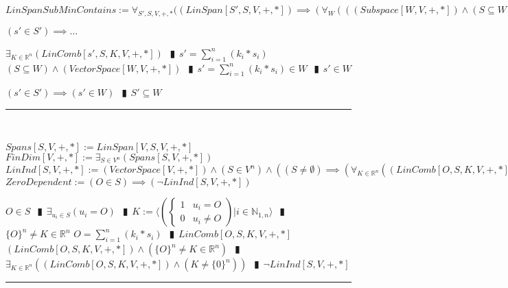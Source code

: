 \documentclass{book}
\newcommand{\abr}{:=}
\newcommand{\pipe}{$\phantom{(}\vrectangleblack\phantom{)}$}
\begin{document}
\begin{shaded}
  $LinSpanSubMinContains \abr \forall_{S', S, V, +, *}((LinSpan[S', S, V, +, *]) \implies (\forall_{W}(((Subspace[W, V, + ,*]) \land (S \subseteq W)) \implies (S' \subseteq W)))$
  \begin{enumerate}
    \lit $(s' \in S') \implies \ldots$
    \begin{enumerate}
      \lit $\exists_{K \in \mathbb{R}^n}(LinComb[s', S, K, V, +, *])$ \pipe $s' = \sum_{i = 1}^{n}(k_i * s_i)$
      \lit $(S \subseteq W) \land (VectorSpace[W, V, + ,*])$ \pipe $s' = \sum_{i = 1}^{n}(k_i * s_i) \in W$ \pipe $s' \in W$
    \end{enumerate}
    \lit $(s' \in S') \implies (s' \in W)$ \pipe $S' \subseteq W$
  \end{enumerate} \vspace{.75mm} \hrule \vspace{.75mm} \ \\ 
\end{shaded} %

$Spans[S, V, +, *] \abr LinSpan[V, S, V, +, *]$ \\
$FinDim[V, +, *] \abr \exists_{S \in V^n}(Spans[S, V, +, *])$ \\

$LinInd[S, V, +, *] \abr (VectorSpace[V, +, *]) \land (S \in V^n) \land ((S \neq \emptyset) \implies (\forall_{K \in \mathbb{R}^n}((LinComb[O, S, K, V, +, *]) \implies (K = \{0\}^n))))$ \\

$ZeroDependent \abr (O \in S) \implies (\lnot LinInd[S, V, +, *])$
\begin{enumerate}
  \lit $O \in S$ \pipe $\exists_{u_i \in S}(u_i = O)$ \pipe $K \abr \langle \left(\begin{cases} 
      1 & u_i = O \\
      0 & u_i \neq O 
    \end{cases}\right) | i \in \mathbb{N}_{1, n} \rangle$ \pipe $\{O\}^n \neq K \in \mathbb{R}^n$
  \lit $O = \sum_{i = 1}^{n}(k_i * s_i)$ \pipe $LinComb[O, S, K, V, +, *]$
  \lit $(LinComb[O, S, K, V, +, *]) \land (\{O\}^n \neq K \in \mathbb{R}^n)$ \pipe $\exists_{K \in \mathbb{R}^n}((LinComb[O, S, K, V, +, *]) \land (K \neq \{0\}^n))$ \pipe $\lnot LinInd[S, V, +, *]$
\end{enumerate} \vspace{.75mm} \hrule \vspace{.75mm} \ \\ 
\end{document}
